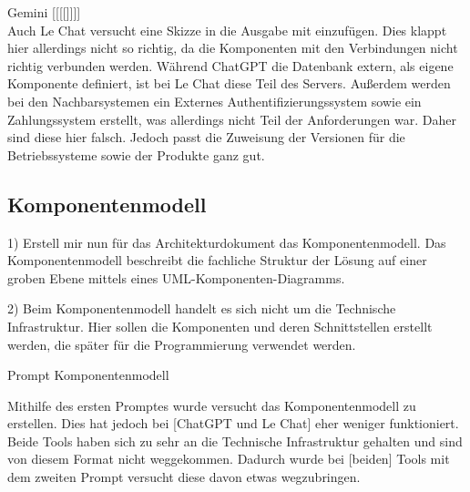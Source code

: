 Gemini [[[[]]]]\\

Auch Le Chat versucht eine Skizze in die Ausgabe mit einzufügen. Dies klappt hier allerdings nicht so richtig, da die Komponenten mit den Verbindungen nicht 
richtig verbunden werden. Während ChatGPT die Datenbank extern, als eigene Komponente definiert, ist bei Le Chat diese Teil des Servers. Außerdem werden bei den
Nachbarsystemen ein Externes Authentifizierungssystem sowie ein Zahlungssystem erstellt, was allerdings nicht Teil der Anforderungen war. Daher sind diese hier 
falsch. Jedoch passt die Zuweisung der Versionen für die Betriebssysteme sowie der Produkte ganz gut.\\


\subsection*{Komponentenmodell}

\begin{prompt}[H]
    \begin{tcolorbox}[colback=gray!20, colframe=gray!20, boxrule=0pt, sharp corners] 
        1) Erstell mir nun für das Architekturdokument das Komponentenmodell. Das Komponentenmodell beschreibt die fachliche Struktur der Lösung auf 
        einer groben Ebene mittels eines UML-Komponenten-Diagramms.
        
        2) Beim Komponentenmodell handelt es sich nicht um die Technische Infrastruktur. Hier sollen die Komponenten und deren Schnittstellen erstellt 
        werden, die später für die Programmierung verwendet werden.
        \vfill
    \end{tcolorbox}
    \caption{Prompt Komponentenmodell}
    \label{Prompt Komponentenmodell}
\end{prompt}

Mithilfe des ersten Promptes wurde versucht das Komponentenmodell zu erstellen. Dies hat jedoch bei [ChatGPT und Le Chat] eher weniger funktioniert.
Beide Tools haben sich zu sehr an die Technische Infrastruktur gehalten und sind von diesem Format nicht weggekommen. Dadurch wurde bei [beiden] Tools
mit dem zweiten Prompt versucht diese davon etwas wegzubringen.\\

